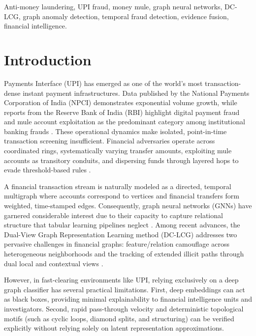 \documentclass[journal]{IEEEtran}
\begin{document}
\begin{IEEEkeywords}
Anti-money laundering, UPI fraud, money mule, graph neural networks, DC-LCG, graph anomaly detection, temporal fraud detection, evidence fusion, financial intelligence.
\end{IEEEkeywords}

\section{Introduction}
 Payments Interface (UPI) has emerged as one of the world's most transaction-dense instant payment infrastructures. Data published by the National Payments Corporation of India (NPCI) demonstrates exponential volume growth, while reports from the Reserve Bank of India (RBI) highlight digital payment fraud and mule account exploitation as the predominant category among institutional banking frauds \cite{npci2026stats, rbi2025annual}. These operational dynamics make isolated, point-in-time transaction screening insufficient. Financial adversaries operate across coordinated rings, systematically varying transfer amounts, exploiting mule accounts as transitory conduits, and dispersing funds through layered hops to evade threshold-based rules \cite{fatf2018virtual, fatf2020identity}.

A financial transaction stream is naturally modeled as a directed, temporal multigraph where accounts correspond to vertices and financial transfers form weighted, time-stamped edges. Consequently, graph neural networks (GNNs) have garnered considerable interest due to their capacity to capture relational structure that tabular learning pipelines neglect \cite{motie2024financial, ma2023comprehensive, pang2021deep}. Among recent advances, the Dual-View Graph Representation Learning method (DC-LCG) addresses two pervasive challenges in financial graphs: feature/relation camouflage across heterogeneous neighborhoods and the tracking of extended illicit paths through dual local and contextual views \cite{li2026dclcg}.

However, in fast-clearing environments like UPI, relying exclusively on a deep graph classifier has several practical limitations. First, deep embeddings can act as black boxes, providing minimal explainability to financial intelligence units and investigators. Second, rapid pass-through velocity and deterministic topological motifs (such as cyclic loops, diamond splits, and structuring) can be verified explicitly without relying solely on latent representation approximations. 
\end{document}
